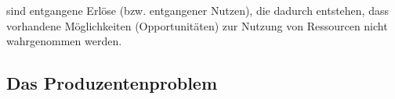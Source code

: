\begin{definition} 
	 sind entgangene Erlöse (bzw. entgangener Nutzen), die dadurch entstehen, dass vorhandene Möglichkeiten (Opportunitäten) zur Nutzung von Ressourcen nicht wahrgenommen werden.
\end{definition}


\subsection{Das Produzentenproblem}
